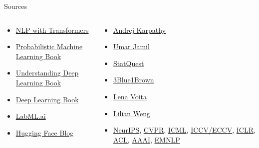 \documentclass{beamer}
\begin{document}
\begin{frame}{Sources}{}
    \begin{columns}
        \begin{column}{0.5\textwidth}
            \begin{itemize}
                \item \href{https://www.amazon.com/Natural-Language-Processing-Transformers-Applications/dp/1098103246}{NLP with Transformers}
                \item \href{https://probml.github.io/pml-book/}{Probabilistic Machine Learning Book}
                \item \href{https://udlbook.github.io/udlbook/}{Understanding Deep Learning Book}
                \item \href{https://www.deeplearningbook.org/}{Deep Learning Book}
                \item \href{https://nn.labml.ai/}{LabML.ai}
                \item \href{https://huggingface.co/blog}{Hugging Face Blog}
            \end{itemize}
        \end{column}
        \begin{column}{0.5\textwidth}
            \begin{itemize}
                \item \href{https://www.youtube.com/@AndrejKarpathy}{Andrej Karpathy}
                \item \href{https://www.youtube.com/@umarjamilai}{Umar Jamil}
                \item \href{https://www.youtube.com/@statquest}{StatQuest}
                \item \href{https://www.youtube.com/@3blue1brown}{3Blue1Brown}
                \item \href{https://lena-voita.github.io/}{Lena Voita}
                \item \href{https://lilianweng.github.io/}{Lilian Weng}
                \item \href{https://neurips.cc/}{NeurIPS}, \href{http://cvpr2024.thecvf.com/}{CVPR}, \href{https://icml.cc/}{ICML}, \href{http://iccv2023.thecvf.com/}{ICCV/ECCV}, \href{https://iclr.cc/}{ICLR}, \href{https://www.aclweb.org/portal/}{ACL}, \href{https://aaai.org/}{AAAI}, \href{https://2024.emnlp.org/}{EMNLP}
            \end{itemize}
        \end{column}
    \end{columns}
\end{frame}
\end{document}
